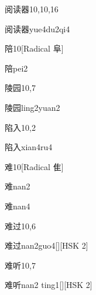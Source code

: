 \begin{entry}{阅读器}{10,10,16}
  \begin{phonetics}{阅读器}{yue4du2qi4}
  \end{phonetics}
\end{entry}

\begin{entry}{陪}{10}[Radical 阜]
  \begin{phonetics}{陪}{pei2}
  \end{phonetics}
\end{entry}

\begin{entry}{陵园}{10,7}
  \begin{phonetics}{陵园}{ling2yuan2}
  \end{phonetics}
\end{entry}

\begin{entry}{陷入}{10,2}
  \begin{phonetics}{陷入}{xian4ru4}
  \end{phonetics}
\end{entry}

\begin{entry}{难}{10}[Radical 隹]
  \begin{phonetics}{难}{nan2}
  \end{phonetics}
  \begin{phonetics}{难}{nan4}
  \end{phonetics}
\end{entry}

\begin{entry}{难过}{10,6}
  \begin{phonetics}{难过}{nan2guo4}[][HSK 2]
  \end{phonetics}
\end{entry}

\begin{entry}{难听}{10,7}
  \begin{phonetics}{难听}{nan2 ting1}[][HSK 2]
  \end{phonetics}
\end{entry}

